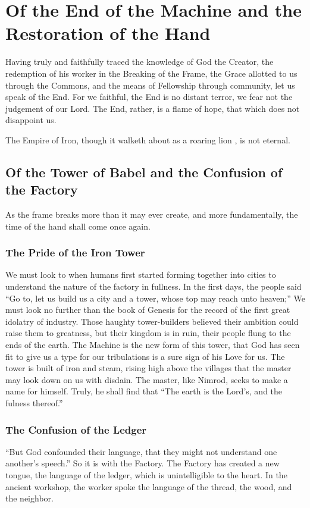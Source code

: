 \chapter{Of the End of the Machine and the Restoration of the Hand}

Having truly and faithfully traced the knowledge of God the Creator, the redemption of his worker in the Breaking of the Frame, the Grace allotted to us through the Commons, and the means of Fellowship through community, let us speak of the End.
For we faithful, the End is no distant terror, we fear not the judgement of our Lord.
The End, rather, is a flame of hope, that which does not disappoint us.

The Empire of Iron, though it walketh about as a roaring lion , is not eternal.
\section{Of the Tower of Babel and the Confusion of the Factory}
As the frame breaks more than it may ever create, and more fundamentally, the time of the hand shall come once again.
\subsection{The Pride of the Iron Tower}
We must look to when humans first started forming together into cities to understand the nature of the factory in fullness.  In the first days, the people said ``Go to, let us build us a city and a tower, whose top may reach unto heaven;''
We must look no further than the book of Genesis for the record of the first great idolatry of industry.
Those haughty tower-builders believed their ambition could raise them to greatness, but their kingdom is in ruin, their people flung to the ends of the earth.
The Machine is the new form of this tower, that God has seen fit to give us a type for our tribulations is a sure sign of his Love for us.
The tower is built of iron and steam, rising high above the villages that the master may look down on us with disdain.
The master, like Nimrod, seeks to make a name for himself.
Truly, he shall find that ``The earth is the Lord's, and the fulness thereof.''
\subsection{The Confusion of the Ledger}
``But God confounded their language, that they might not understand one another’s speech.''
So it is with the Factory.
The Factory has created a new tongue, the language of the ledger, which is unintelligible to the heart.
In the ancient workshop, the worker spoke the language of the thread, the wood, and the neighbor.


